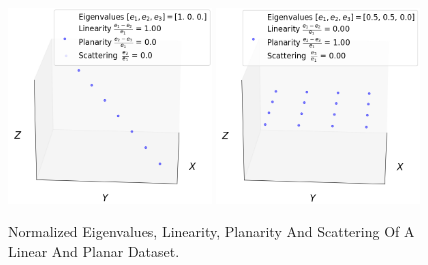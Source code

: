 \documentclass[%
]{USN-MSc}
\begin{document}
\begin{figure}[H]
  \centering
  \includegraphics[width=0.48\textwidth]{fig/Linear System.png}
  \includegraphics[width=0.48\textwidth]{fig/Planar System.png}
  \caption{Normalized Eigenvalues, Linearity, Planarity And Scattering Of A Linear And Planar Dataset.}
  \label{fig:Linear system}
\end{figure}
\end{document}

